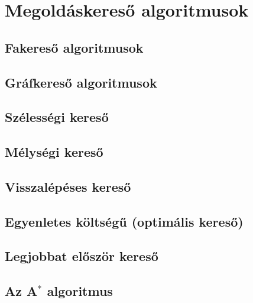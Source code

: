 \section{Megoldáskereső algoritmusok}

\subsection{Fakereső algoritmusok}

\subsection{Gráfkereső algoritmusok}

\subsection{Szélességi kereső}

\subsection{Mélységi kereső}

\subsection{Visszalépéses kereső}

\subsection{Egyenletes költségű (optimális kereső)}

\subsection{Legjobbat először kereső}

\subsection{Az A$^*$ algoritmus}
